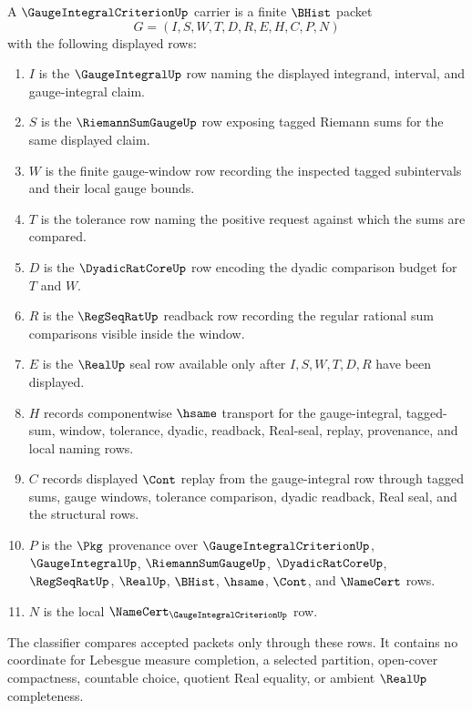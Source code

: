 \begin{definition}
\label{def:gauge-integral-criterion-carrier}
A $\GaugeIntegralCriterionUp$ carrier is a finite $\BHist$ packet
$$
G=(I,S,W,T,D,R,E,H,C,P,N)
$$
with the following displayed rows:
\begin{enumerate}
\item $I$ is the $\GaugeIntegralUp$ row naming the displayed integrand, interval, and gauge-integral claim.
\item $S$ is the $\RiemannSumGaugeUp$ row exposing tagged Riemann sums for the same displayed claim.
\item $W$ is the finite gauge-window row recording the inspected tagged subintervals and their local gauge bounds.
\item $T$ is the tolerance row naming the positive request against which the sums are compared.
\item $D$ is the $\DyadicRatCoreUp$ row encoding the dyadic comparison budget for $T$ and $W$.
\item $R$ is the $\RegSeqRatUp$ readback row recording the regular rational sum comparisons visible inside the window.
\item $E$ is the $\RealUp$ seal row available only after $I,S,W,T,D,R$ have been displayed.
\item $H$ records componentwise $\hsame$ transport for the gauge-integral, tagged-sum, window, tolerance, dyadic, readback, Real-seal, replay, provenance, and local naming rows.
\item $C$ records displayed $\Cont$ replay from the gauge-integral row through tagged sums, gauge windows, tolerance comparison, dyadic readback, Real seal, and the structural rows.
\item $P$ is the $\Pkg$ provenance over $\GaugeIntegralCriterionUp$, $\GaugeIntegralUp$, $\RiemannSumGaugeUp$, $\DyadicRatCoreUp$, $\RegSeqRatUp$, $\RealUp$, $\BHist$, $\hsame$, $\Cont$, and $\NameCert$ rows.
\item $N$ is the local $\NameCert_{\GaugeIntegralCriterionUp}$ row.
\end{enumerate}
The classifier compares accepted packets only through these rows. It contains no coordinate for Lebesgue measure completion, a selected partition, open-cover compactness, countable choice, quotient Real equality, or ambient $\RealUp$ completeness.
\end{definition}

